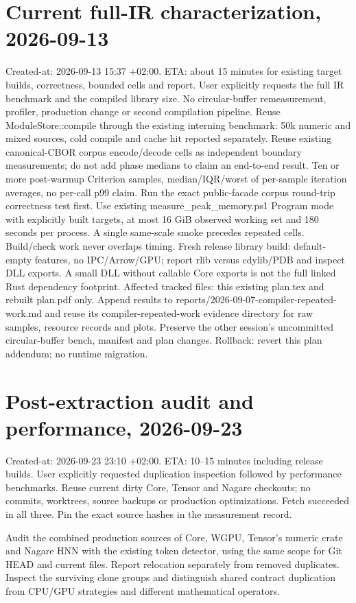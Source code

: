 \documentclass[11pt,a4paper]{article}
\begin{document}
\section*{Current full-IR characterization, 2026-09-13}
Created-at: 2026-09-13 15:37 +02:00. ETA: about 15 minutes for existing
target builds, correctness, bounded cells and report. User explicitly requests
the full IR benchmark and the compiled library size. No circular-buffer
remeasurement, profiler, production change or second compilation pipeline.
Reuse ModuleStore::compile through the existing interning benchmark: 50k numeric
and mixed sources, cold compile and cache hit reported separately. Reuse existing
canonical-CBOR corpus encode/decode cells as independent boundary measurements;
do not add phase medians to claim an end-to-end result. Ten or more post-warmup
Criterion samples, median/IQR/worst of per-sample iteration averages, no per-call
p99 claim. Run the exact public-facade corpus round-trip correctness test first.
Use existing measure\_peak\_memory.ps1 Program mode with explicitly built targets,
at most 16 GiB observed working set and 180 seconds per process. A single
same-scale smoke precedes repeated cells. Build/check work never overlaps timing.
Fresh release library build: default-empty features, no IPC/Arrow/GPU; report
rlib versus cdylib/PDB and inspect DLL exports. A small DLL without callable
Core exports is not the full linked Rust dependency footprint.
Affected tracked files: this existing plan.tex and rebuilt plan.pdf only.
Append results to reports/2026-09-07-compiler-repeated-work.md and reuse its
compiler-repeated-work evidence directory for raw samples, resource records and
plots. Preserve the other session's uncommitted circular-buffer bench, manifest
and plan changes. Rollback: revert this plan addendum; no runtime migration.

\section*{Post-extraction audit and performance, 2026-09-23}
Created-at: 2026-09-23 23:10 +02:00. ETA: 10--15 minutes including release
builds. User explicitly requested duplication inspection followed by performance
benchmarks. Reuse current dirty Core, Tensor and Nagare checkouts; no commits,
worktrees, source backups or production optimizations. Fetch succeeded in all
three. Pin the exact source hashes in the measurement record.

Audit the combined production sources of Core, WGPU, Tensor's numeric crate
and Nagare HNN with the existing token detector, using the same scope for Git
HEAD and current files. Report relocation separately from removed duplicates.
Inspect the surviving clone groups and distinguish shared contract duplication
from CPU/GPU strategies and different mathematical operators.
\end{document}
